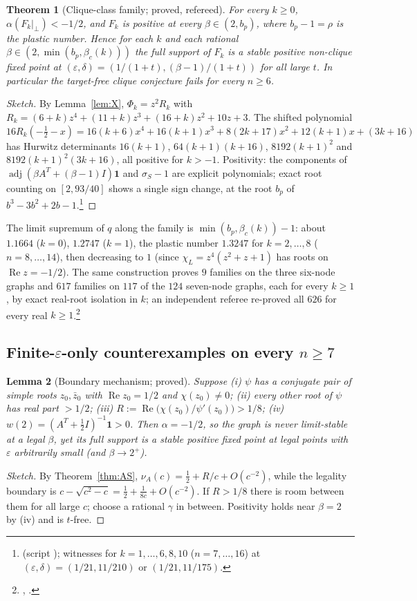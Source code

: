 \documentclass[11pt]{article}
\newtheorem{theorem}{Theorem}[section]
\newtheorem{lemma}[theorem]{Lemma}
\theoremstyle{definition}
\newcommand{\one}{\mathbf{1}}
\newcommand{\eps}{\varepsilon}
\newcommand{\perpc}[1]{#1|_{\perp}}
\newcommand{\adj}{\operatorname{adj}}
\newcommand{\Rea}{\operatorname{Re}}
\begin{document}
\begin{theorem}[Clique-class family; proved, refereed]\label{thm:famF}
For every $k\ge0$, $\alpha(\perpc{F_k})<-1/2$, and $F_k$ is positive at every $\beta\in(2,b_p)$, where $b_p-1=\rho$ is the
plastic number. Hence for each $k$ and each rational $\beta\in(2,\min(b_p,\beta_c(k)))$ the full support of $F_k$ is a stable
positive non-clique fixed point at $(\eps,\delta)=(1/(1+t),(\beta-1)/(1+t))$ for all large $t$. In particular the target-free
clique conjecture fails for every $n\ge6$.
\end{theorem}
\begin{proof}[Sketch]
By Lemma~\ref{lem:X}, $\Phi_k=z^2R_k$ with $R_k=(6+k)z^4+(11+k)z^3+(16+k)z^2+10z+3$. The shifted polynomial
$16R_k(-\tfrac12-x)=16(k+6)x^4+16(k+1)x^3+8(2k+17)x^2+12(k+1)x+(3k+16)$ has Hurwitz determinants
$16(k+1)$, $64(k+1)(k+16)$, $8192(k+1)^2$ and $8192(k+1)^2(3k+16)$, all positive for $k>-1$. Positivity: the components of
$\adj(\beta A^T+(\beta-1)I)\one$ and $\sigma_S-1$ are explicit polynomials; exact root counting on $[2,93/40]$ shows a single
sign change, at the root $b_p$ of $b^3-3b^2+2b-1$.\footnote{ (script ); witnesses for $k=1,\dots,6,8,10$ ($n=7,\dots,16$) at $(\eps,\delta)=(1/21,11/210)$ or $(1/21,11/175)$.}
\end{proof}
The limit supremum of $q$ along the family is $\min(b_p,\beta_c(k))-1$: about $1.1664$ ($k=0$), $1.2747$ ($k=1$), the plastic
number $1.3247$ for $k=2,\dots,8$ ($n=8,\dots,14$), then decreasing to $1$ (since $\chi_L=z^4(z^2+z+1)$ has roots on
$\Rea z=-1/2$). The same construction proves $9$ families on the three six-node graphs and $617$ families on $117$ of the
$124$ seven-node graphs, each for every $k\ge1$, by exact real-root isolation in $k$; an independent referee re-proved all $626$
for every real $k\ge1$.\footnote{, .}

\subsection{Finite-\texorpdfstring{$\eps$}{eps}-only counterexamples on every \texorpdfstring{$n\ge7$}{n >= 7}}
\begin{lemma}[Boundary mechanism; proved]\label{lem:Bmech}
Suppose (i) $\psi$ has a conjugate pair of simple roots $z_0,\bar z_0$ with $\Rea z_0=1/2$ and $\chi(z_0)\ne0$; (ii) every other
root of $\psi$ has real part $>1/2$; (iii) $R:=\Rea\bigl(\chi(z_0)/\psi'(z_0)\bigr)>1/8$; (iv) $w(2)=(A^T+\tfrac12I)^{-1}\one>0$.
Then $\alpha=-1/2$, so the graph is never limit-stable at a legal $\beta$, yet its full support is a stable positive fixed point at
legal points with $\eps$ arbitrarily small (and $\beta\to2^+$).
\end{lemma}
\begin{proof}[Sketch]
By Theorem~\ref{thm:AS}, $\nu_A(c)=\tfrac12+R/c+O(c^{-2})$, while the legality boundary is
$c-\sqrt{c^2-c}=\tfrac12+\tfrac1{8c}+O(c^{-2})$. If $R>1/8$ there is room between them for all large $c$; choose a rational
$\gamma$ in between. Positivity holds near $\beta=2$ by (iv) and is $t$-free.
\end{proof}
\end{document}
